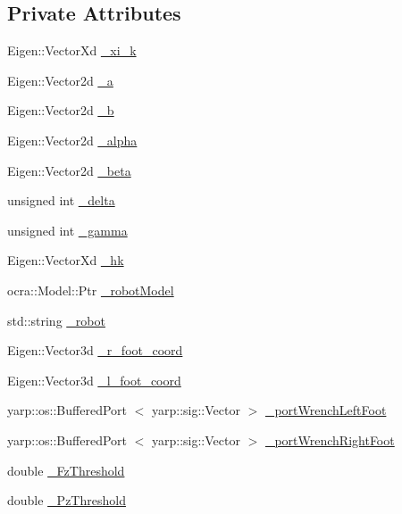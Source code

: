 \subsection*{\-Private \-Attributes}
\begin{DoxyCompactItemize}
\item 
\-Eigen\-::\-Vector\-Xd \hyperlink{classMIQPState_a48c4888bcda11bf1cfcdbc59271de45a}{\-\_\-xi\-\_\-k}
\item 
\-Eigen\-::\-Vector2d \hyperlink{classMIQPState_a2977495d57c42885d5463996dd8397fa}{\-\_\-a}
\item 
\-Eigen\-::\-Vector2d \hyperlink{classMIQPState_ae887a41c5a843a6ed534b33a78749a16}{\-\_\-b}
\item 
\-Eigen\-::\-Vector2d \hyperlink{classMIQPState_a8eca5349734a0289a02228d1c31aab59}{\-\_\-alpha}
\item 
\-Eigen\-::\-Vector2d \hyperlink{classMIQPState_aa590ce01a7f43336bf636c9efd6a72c2}{\-\_\-beta}
\item 
unsigned int \hyperlink{classMIQPState_ae6835173e7c76c0fe73ed7e678eec3ff}{\-\_\-delta}
\item 
unsigned int \hyperlink{classMIQPState_a301e5b0d635eb7058efd679d9acc621d}{\-\_\-gamma}
\item 
\-Eigen\-::\-Vector\-Xd \hyperlink{classMIQPState_aab11608d49f1401e1a44512e73157d16}{\-\_\-hk}
\item 
ocra\-::\-Model\-::\-Ptr \hyperlink{classMIQPState_a0877788b247896c3434925e176c5045f}{\-\_\-robot\-Model}
\item 
std\-::string \hyperlink{classMIQPState_ab472b9541beae0dacd48f8efb170490a}{\-\_\-robot}
\item 
\-Eigen\-::\-Vector3d \hyperlink{classMIQPState_a629de41d12e78c8a25b779758fd09bee}{\-\_\-r\-\_\-foot\-\_\-coord}
\item 
\-Eigen\-::\-Vector3d \hyperlink{classMIQPState_a5b51d0cbeab4414b0736de96a3c81b7b}{\-\_\-l\-\_\-foot\-\_\-coord}
\item 
yarp\-::os\-::\-Buffered\-Port\*
$<$ yarp\-::sig\-::\-Vector $>$ \hyperlink{classMIQPState_a9c042137f569724cd6ac62c0b2effdb1}{\-\_\-port\-Wrench\-Left\-Foot}
\item 
yarp\-::os\-::\-Buffered\-Port\*
$<$ yarp\-::sig\-::\-Vector $>$ \hyperlink{classMIQPState_a8e81519be2adf55a6d5e26457e1e07c2}{\-\_\-port\-Wrench\-Right\-Foot}
\item 
double \hyperlink{classMIQPState_abbd7af6ecdc9b2baebdebb473d4906cc}{\-\_\-\-Fz\-Threshold}
\item 
double \hyperlink{classMIQPState_af01491319642a332145ba8e8c23306b0}{\-\_\-\-Pz\-Threshold}
\end{DoxyCompactItemize}
